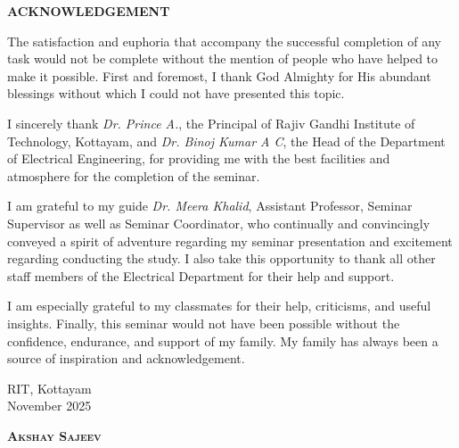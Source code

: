 \documentclass[12pt,a4paper]{report}
\begin{document}
\setcounter{page}{1}   %

\begin{center}
    \textbf{\Large ACKNOWLEDGEMENT}
\end{center}


\noindent
\hspace{2em}The satisfaction and euphoria that accompany the successful completion of any task would not be complete without the mention of people who have helped to make it possible. First and foremost, I thank God Almighty for His abundant blessings without which I could not have presented this topic.

\vspace{0.5em}

\noindent
\hspace{2em}I sincerely thank \textit{Dr. Prince A.}, the Principal of Rajiv Gandhi Institute of Technology, Kottayam, and \textit{Dr. Binoj Kumar A C}, the Head of the Department of Electrical Engineering, for providing me with the best facilities and atmosphere for the completion of the seminar.

\vspace{0.5em}

\noindent
\hspace{2em}I am grateful to my guide \textit{Dr. Meera Khalid}, Assistant Professor, Seminar Supervisor as well as Seminar Coordinator, who continually and convincingly conveyed a spirit of adventure regarding my seminar presentation and excitement regarding conducting the study. I also take this opportunity to thank all other staff members of the Electrical Department for their help and support.  

\vspace{0.5em}

\noindent
\hspace{2em}I am especially grateful to my classmates for their help, criticisms, and useful insights. Finally, this seminar would not have been possible without the confidence, endurance, and support of my family. My family has always been a source of inspiration and acknowledgement.

\vspace{2em}

\noindent
\begin{minipage}{0.45\linewidth}
\begin{flushleft}
RIT, Kottayam\\
November 2025
\end{flushleft}
\end{minipage}
\hfill
\begin{minipage}{0.45\linewidth}
\begin{flushright}
\textbf{\textsc{Akshay Sajeev}}
\end{flushright}
\end{minipage}
\end{document}
